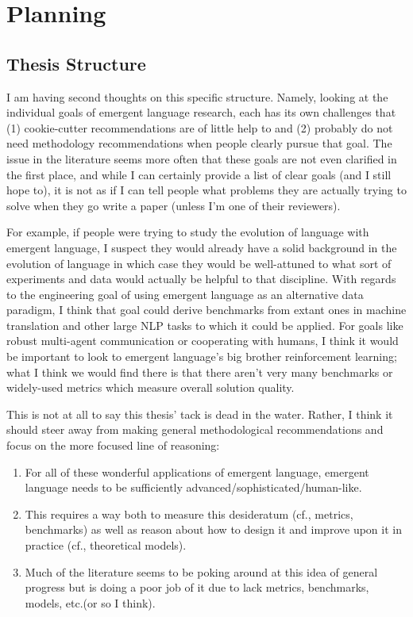 \setcounter{chapter}{-1}
\chapter{Planning}

\section{Thesis Structure}
I am having second thoughts on this specific structure.
Namely, looking at the individual goals of emergent language research, each has its own challenges that (1) cookie-cutter recommendations are of little help to and (2) probably do not need methodology recommendations when people clearly pursue that goal.
The issue in the literature seems more often that these goals are not even clarified in the first place, and while I can certainly provide a list of clear goals (and I still hope to), it is not as if I can tell people what problems they are actually trying to solve when they go write a paper (unless I'm one of their reviewers).

For example, if people were trying to study the evolution of language with emergent language, I suspect they would already have a solid background in the evolution of language in which case they would be well-attuned to what sort of experiments and data would actually be helpful to that discipline.
With regards to the engineering goal of using emergent language as an alternative data paradigm, I think that goal could derive benchmarks from extant ones in machine translation and other large NLP tasks to which it could be applied.
For goals like robust multi-agent communication or cooperating with humans, I think it would be important to look to emergent language's big brother reinforcement learning; what I think we would find there is that there aren't very many benchmarks or widely-used metrics which measure overall solution quality.

This is not at all to say this thesis' tack is dead in the water.
Rather, I think it should steer away from making general methodological recommendations and focus on the more focused line of reasoning:
\begin{enumerate}
    \item For all of these wonderful applications of emergent language, emergent language needs to be sufficiently advanced/sophisticated/human-like.
    \item This requires a way both to measure this desideratum (cf., metrics, benchmarks) as well as reason about how to design it and improve upon it in practice (cf., theoretical models).
    \item Much of the literature seems to be poking around at this idea of general progress but is doing a poor job of it due to lack metrics, benchmarks, models, etc.\@ (or so I think).
\end{enumerate}



